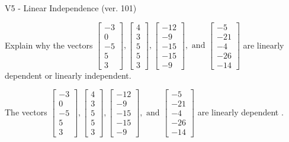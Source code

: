 \begin{exercise}
  \begin{exerciseTitle}V5 - Linear Independence (ver. 101)\end{exerciseTitle}
  \begin{exerciseStatement}
    Explain why the vectors \(\left[\begin{array}{r}
-3 \\
0 \\
-5 \\
5 \\
3
\end{array}\right] , \left[\begin{array}{r}
4 \\
3 \\
5 \\
5 \\
3
\end{array}\right] , \left[\begin{array}{r}
-12 \\
-9 \\
-15 \\
-15 \\
-9
\end{array}\right] , \text{ and } \left[\begin{array}{r}
-5 \\
-21 \\
-4 \\
-26 \\
-14
\end{array}\right]\) are linearly dependent or linearly independent.	


  \end{exerciseStatement}
  \begin{exerciseAnswer}
   The vectors \(\left[\begin{array}{r}
-3 \\
0 \\
-5 \\
5 \\
3
\end{array}\right] , \left[\begin{array}{r}
4 \\
3 \\
5 \\
5 \\
3
\end{array}\right] , \left[\begin{array}{r}
-12 \\
-9 \\
-15 \\
-15 \\
-9
\end{array}\right] , \text{ and } \left[\begin{array}{r}
-5 \\
-21 \\
-4 \\
-26 \\
-14
\end{array}\right]\) are 
  	 linearly dependent  .
  


  \end{exerciseAnswer}
\end{exercise}